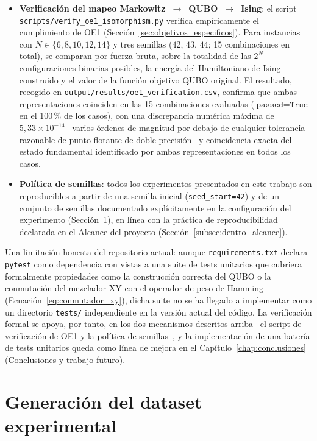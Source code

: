 \begin{itemize}
    \item \textbf{Verificación del mapeo Markowitz~$\rightarrow$~QUBO~$\rightarrow$~Ising}: el script \texttt{scripts/verify\_oe1\_isomorphism.py} verifica empíricamente el cumplimiento de OE1 (Sección~\ref{sec:objetivos_especificos}). Para instancias con $N \in \{6, 8, 10, 12, 14\}$ y tres semillas ($42$, $43$, $44$; 15 combinaciones en total), se comparan por fuerza bruta, sobre la totalidad de las $2^N$ configuraciones binarias posibles, la energía del Hamiltoniano de Ising construido y el valor de la función objetivo QUBO original. El resultado, recogido en \texttt{output/results/oe1\_verification.csv}, confirma que ambas representaciones coinciden en las 15 combinaciones evaluadas ($\texttt{passed}=\texttt{True}$ en el 100\,\% de los casos), con una discrepancia numérica máxima de $5{,}33\times10^{-14}$ --varios órdenes de magnitud por debajo de cualquier tolerancia razonable de punto flotante de doble precisión-- y coincidencia exacta del estado fundamental identificado por ambas representaciones en todos los casos.
    \item \textbf{Política de semillas}: todos los experimentos presentados en este trabajo son reproducibles a partir de una semilla inicial (\texttt{seed\_start=42}) y de un conjunto de semillas documentado explícitamente en la configuración del experimento (Sección~\ref{sec:dataset-final}), en línea con la práctica de reproducibilidad declarada en el Alcance del proyecto (Sección~\ref{subsec:dentro_alcance}).
\end{itemize}

Una limitación honesta del repositorio actual: aunque \texttt{requirements.txt} declara \texttt{pytest} como dependencia con vistas a una suite de tests unitarios que cubriera formalmente propiedades como la construcción correcta del QUBO o la conmutación del mezclador XY con el operador de peso de Hamming (Ecuación~\eqref{eq:conmutador_xy}), dicha suite no se ha llegado a implementar como un directorio \texttt{tests/} independiente en la versión actual del código. La verificación formal se apoya, por tanto, en los dos mecanismos descritos arriba --el script de verificación de OE1 y la política de semillas--, y la implementación de una batería de tests unitarios queda como línea de mejora en el Capítulo~\ref{chap:conclusiones} (Conclusiones y trabajo futuro).

\section{Generación del dataset experimental}
\label{sec:dataset-final}

